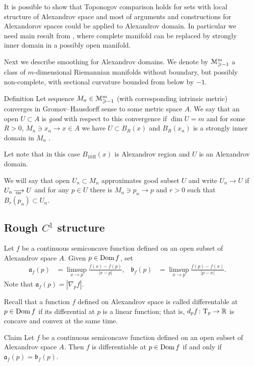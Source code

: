 It is possible to show  that 
Toponogov comparison holds for sets with local structure of Alexandrov space and most of arguments and constructions for Alexandorov spaces could be applied to Alexandrov domain.
In particular we need main result from
 \cite{petrunin-SC}, where complete manifold can be replaced by 
strongly inner domain in a possibly open manifold. 
 
 
 
 Next we describe smoothing for Alexandrov domains.
 We denote by
$\mathcal M_{\geqslant -1}^m$ a class of $m$-dimensional Riemannian 
manifolds without boundary, but possibly non-complete, with sectional curvature bounded
from below by $-1$.

\begin{rdef}{Definition}
Let sequence
$M_n\in\mathcal M_{\geqslant -1}^m$ (with corresponding intrinsic metric)
converges in Gromov--Hausdorff sense to some metric space $A$.
We say that an open $U\subset A$ is \emph{good} with respect to this convergence
 if
$\dim U=m$ and for some 
$R>0$, $M_n\ni x_n\to x\in A$ we have
$U\subset B_R(x)$
and ${B_{R}(x_n)}$ is a strongly inner domain in
$ M_n$
. 
\end{rdef}
 Let note that in this case $B_{10R}(x)$ is Alexandrov region
 and $U$ is an Alexandrov domain.
 
 We will say that open $U_n\subset M_n$
approximates good subset $U$ and write $U_n\to U$
if $U_n\GHto U$ and for any $p\in U$ there is $M_n\ni p_n\to p$
and $r>0$ such that $B_r(p_n)\subset U_n$.
 
 \subsection{Rough $C^1$ structure }\label{sec:rC}
 
 
Let $f$ be a continuous semiconcave function defined on an open subset of Alexandrov space $A$.
Given $p\in \mathop{\rm Dom} f$, set 
\begin{align*}
\mathfrak{a}_f(p)&=\limsup_{x\to p}\frac{f(x)-f(p)}{|x-p|},
&
\mathfrak{b}_f(p)&=\limsup_{x\to p}\frac{f(p)-f(x)}{|p-x|}.
\end{align*}
Note that $\mathfrak{a}_f(p)=|\nabla_pf|$.



Recall that a function $f$ defined on Alexandrov space is called differentable at $p\in \mathop{\rm Dom} f$ if its differential at $p$ is a linear function;
that is, $d_pf\colon\text{\rm T}_p\to\mathbb{R}$ is concave and convex at the same time.

\begin{thm}{Claim} Let $f$ be a continuous semiconcave function defined on an open subset of Alexandrov space $A$.
Then  $f$ is differentiable at $p\in\mathop{\rm Dom} f$ if and only if $\mathfrak{a}_f(p)=\mathfrak{b}_f(p)$.
\end{thm}





